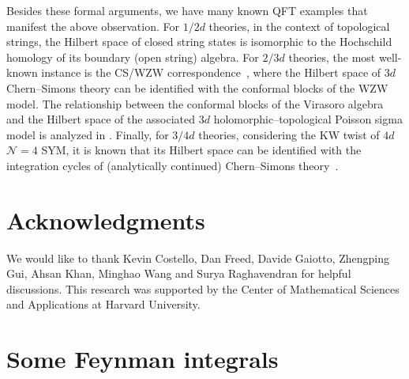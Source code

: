 \documentclass[11pt]{article}
\newcommand{\C}{\mathbb{C}}
\newcommand\sbullet[1][.5]{\mathbin{\vcenter{\hbox{\scalebox{#1}{$\bullet$}}}}}
\DeclareMathOperator{\Tr}{Tr}
\numberwithin{equation}{section}
\begin{document}
Besides these formal arguments, we have many known QFT examples that manifest the above observation. For $1/2d$ theories, in the context of topological strings, the Hilbert space of closed string states is isomorphic to the Hochschild homology of its boundary (open string) algebra. For $2/3d$ theories, the most well-known instance is the CS/WZW correspondence~\cite{witten1989quantum}, where the Hilbert space of $3d$ Chern--Simons theory can be identified with the conformal blocks of the WZW model. The relationship between the conformal blocks of the Virasoro algebra and the Hilbert space of the associated $3d$ holomorphic--topological Poisson sigma model is analyzed in \cite{khan2025poisson}. Finally, for $3/4d$ theories, considering the KW twist of $4d$ $\mathcal{N} = 4$ SYM, it is known that its Hilbert space can be identified with the integration cycles of (analytically continued) Chern--Simons theory~\cite{Witten:2010cx}.

\section*{Acknowledgments}
We would like to thank Kevin Costello, Dan Freed, Davide Gaiotto, Zhengping Gui, Ahsan Khan, Minghao Wang and Surya Raghavendran for helpful discussions. This research was supported by the Center of Mathematical Sciences and Applications at Harvard University.

 \appendix
 
 \section{Some Feynman integrals}
\end{document}
